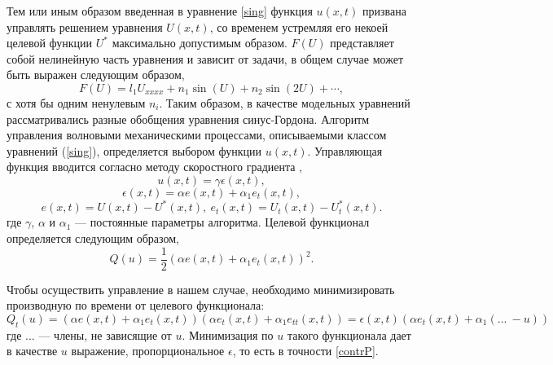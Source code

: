 Тем или иным образом введенная в уравнение \eqref{sing} функция $u(x,t)$ призвана управлять решением уравнения $U(x,t)$, со временем устремляя его некоей целевой функции $U^*$ максимально допустимым образом. $F\left(U\right)$ представляет собой нелинейную часть уравнения и зависит от задачи, в общем случае может быть выражен следующим образом,
$$
F\left(U\right) = l_1 U_{xxxx} + n_1 \sin (U) + n_2 \sin(2 U) + \cdots,
$$
с хотя бы одним ненулевым $n_i$. Таким образом, в качестве модельных уравнений рассматривались разные обобщения уравнения синус-Гордона. Алгоритм управления волновыми механическими процессами, описываемыми классом уравнений (\ref{sing}), определяется выбором функции $u(x,t)$. Управляющая функция вводится согласно методу скоростного градиента \cite{fradkov_rus_speed_grad},
\begin{equation}
	u(x,t)=\gamma \epsilon(x,t),
	\label{contrP}
\end{equation}
$$
\epsilon(x,t)=\alpha e(x,t)+\alpha_1 e_t(x,t),
$$
$$
e(x,t)=U(x,t)-U^*(x,t),~ e_t(x,t)=U_t(x,t)-U^*_t(x,t).
$$
где $\gamma$, $\alpha$ и $\alpha_1$ --- постоянные параметры алгоритма. Целевой функционал определяется следующим образом,
\begin{equation}
	Q(u)=\frac{1}{2}(\alpha e(x,t) + \alpha_1 e_t(x,t))^2.
\end{equation}

Чтобы осуществить управление в нашем случае, необходимо минимизировать производную по времени от целевого функционала:
\begin{equation}
	Q_t(u) = (\alpha e(x,t) + \alpha_1 e_t(x,t))(\alpha e_t(x,t) + \alpha_1 e_{tt}(x,t)) = \epsilon(x,t)(\alpha e_t(x,t) + \alpha_1 (... \: -u))
\end{equation}
где $...$ --- члены, не зависящие от $u$. Минимизация по $u$ такого функционала дает в качестве $u$ выражение, пропорциональное $\epsilon$, то есть в точности \eqref{contrP}. 




